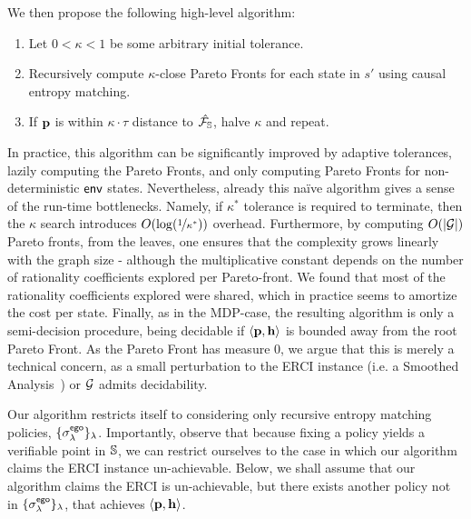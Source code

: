 \begin{mdframed}
  We then propose the following high-level algorithm:
\begin{enumerate}
\item Let $0 < \kappa < 1$ be some arbitrary initial tolerance.
\item Recursively compute $\kappa$-close Pareto Fronts for each state
in $s'$ using causal entropy matching.
\item If $\mathbf{p}$ is within $\kappa\cdot \tau$ distance to $\hat{\mathcal{F}_{\mathbb{S}}}$,
  halve $\kappa$ and repeat.
\end{enumerate}  
\end{mdframed}
In practice, this algorithm can be significantly improved by adaptive
tolerances, lazily computing the Pareto Fronts, and only computing
Pareto Fronts for non-deterministic $\mathsf{env}$ states. Nevertheless,
already this na\"ive algorithm gives a sense of the run-time
bottlenecks. Namely, if $\kappa^*$ tolerance is required to terminate,
then the $\kappa$ search introduces $O(\log(\nicefrac{1}{\kappa^*}))$
overhead. Furthermore, by computing $O(|\mathcal{G}|)$ Pareto fronts, from the
leaves, one ensures that the complexity grows linearly with the graph
size - although the multiplicative constant depends on the number of
rationality coefficients explored per Pareto-front. We found that most
of the rationality coefficients explored were shared, which in
practice seems to amortize the cost per state. Finally, as in the
MDP-case, the resulting algorithm is only a semi-decision procedure,
being decidable if $\langle \mathbf{p}, \mathbf{h} \rangle$ is
bounded away from the root Pareto Front. As the Pareto Front has
measure 0, we argue that this is merely a technical concern, as a
small perturbation to the ERCI instance (i.e. a Smoothed
Analysis~\cite{SmoothedAnalysis}) or $\mathcal{G}$ admits decidability.

 Our algorithm restricts itself to
considering only recursive entropy matching policies,
$\{\sigma^{\mathsf{ego}}_\lambda\}_\lambda$. Importantly, observe that because
fixing a policy yields a verifiable point in $\mathbb{S}$,
we can restrict ourselves to the case in which our algorithm claims
the ERCI instance un-achievable.
Below, we shall assume that our
algorithm claims the ERCI is un-achievable, but there exists
another policy not in $\{\sigma^{\mathsf{ego}}_\lambda\}_\lambda$, that achieves
$\langle \mathbf{p}, \mathbf{h} \rangle$.


